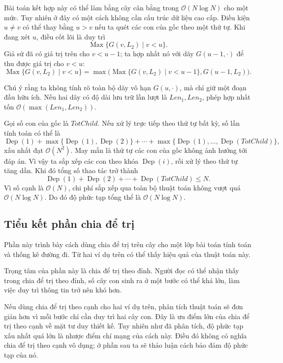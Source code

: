 \documentclass[11pt]{article}
\newcommand{\Oh}{\mathcal{O}}
\newcommand{\Dep}{\operatorname{Dep}}
\newcommand{\Max}{\operatorname{Max}}
\begin{document}
Bài toán kết hợp này có thể làm bằng cây cân bằng trong
\(\Oh(N\log N)\) cho một mức. Tuy nhiên ở đây có một cách không cần cấu trúc
dữ liệu cao cấp. Điều kiện \(u\ne v\) có thể thay bằng \(u>v\) nếu ta quét các
con của gốc theo một thứ tự. Khi đang xét \(u\), điều cốt lõi là duy trì
\[
  \Max\{G(v,L_2)\mid v<u\}.
\]
Giả sử đã có giá trị trên cho \(v<u-1\); ta hợp nhất nó với dãy \(G(u-1,\cdot)\)
để thu được giá trị cho \(v<u\):
\[
  \Max\{G(v,L_2)\mid v<u\}
  =\max\bigl(\Max\{G(v,L_2)\mid v<u-1\},G(u-1,L_2)\bigr).
\]

Chú ý rằng ta không tính rõ toàn bộ dãy vô hạn \(G(u,\cdot)\), mà chỉ giữ một
đoạn đầu hữu ích. Nếu hai dãy có độ dài lưu trữ lần lượt là
\(\mathit{Len}_1,\mathit{Len}_2\), phép hợp nhất tốn
\(\Oh(\max(\mathit{Len}_1,\mathit{Len}_2))\).

Gọi số con của gốc là \(\mathit{TotChild}\). Nếu xử lý trực tiếp theo thứ tự
bất kỳ, số lần tính toán có thể là
\[
  \Dep(1)+\max\{\Dep(1),\Dep(2)\}+\cdots+
  \max\{\Dep(1),\ldots,\Dep(\mathit{TotChild})\},
\]
xấu nhất đạt \(\Oh(N^2)\). May mắn là thứ tự các con của gốc không ảnh hưởng
tới đáp án. Vì vậy ta sắp xếp các con theo khóa \(\Dep(i)\), rồi xử lý theo
thứ tự tăng dần. Khi đó tổng số thao tác trở thành
\[
  \Dep(1)+\Dep(2)+\cdots+\Dep(\mathit{TotChild})\le N.
\]
Vì số cạnh là \(\Oh(N)\), chi phí sắp xếp qua toàn bộ thuật toán không vượt
quá \(\Oh(N\log N)\). Do đó độ phức tạp tổng thể là \(\Oh(N\log N)\).

\subsection{Tiểu kết phần chia để trị}

Phần này trình bày cách dùng chia để trị trên cây cho một lớp bài toán tính
toán và thống kê đường đi. Từ hai ví dụ trên có thể thấy hiệu quả của thuật
toán này.

Trọng tâm của phần này là chia để trị theo đỉnh. Người đọc có thể nhận thấy
trong chia để trị theo đỉnh, số cây con sinh ra ở một bước có thể khá lớn, làm
việc duy trì thông tin trở nên khó hơn.

Nếu dùng chia để trị theo cạnh cho hai ví dụ trên, phân tích thuật toán sẽ đơn
giản hơn vì mỗi bước chỉ cần duy trì hai cây con. Đây là ưu điểm lớn của chia
để trị theo cạnh về mặt tư duy thiết kế. Tuy nhiên như đã phân tích, độ phức
tạp xấu nhất quá lớn là nhược điểm chí mạng của cách này. Điều đó không có
nghĩa chia để trị theo cạnh vô dụng; ở phần sau ta sẽ thảo luận cách bảo đảm
độ phức tạp của nó.
\end{document}
